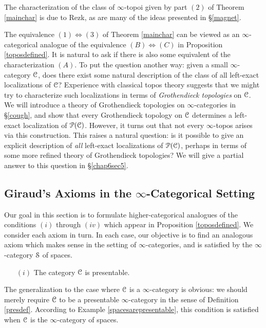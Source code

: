 \begin{remark}
The characterization of the class of $\infty$-topoi given by part $(2)$ of Theorem \ref{mainchar} is due to Rezk, as are many of the ideas presented in \S \ref{magnet}.
\end{remark}

The equivalence $(1) \Leftrightarrow (3)$ of Theorem \ref{mainchar} can be viewed as an $\infty$-categorical analogue of the equivalence $(B) \Leftrightarrow (C)$ in Proposition \ref{toposdefined}. 
It is natural to ask if there is also some equivalent of the characterization $(A)$. To put the question another way: given a small $\infty$-category $\operatorname{\mathcal{C}}$, does there exist some natural description of the class of all left-exact localizations of $\operatorname{\mathcal{C}}$? Experience with classical topos theory suggests that we might try to characterize such localizations in terms of {\em Grothendieck topologies} on $\operatorname{\mathcal{C}}$. We will introduce a theory of Grothendieck topologies on $\infty$-categories in \S \ref{cough}, and show that every Grothendieck topology on $\operatorname{\mathcal{C}}$ determines a left-exact localization of $\operatorname{\mathcal{P}}(\operatorname{\mathcal{C}})$. However, it turns out that not every $\infty$-topos arises via this construction. This raises a natural question: is it possible to give an explicit description of {\em all} left-exact localizations of $\operatorname{\mathcal{P}}(\operatorname{\mathcal{C}})$, perhaps in terms of some more refined theory of Grothendieck topologies? We will give a partial answer to this question in \S \ref{chap6sec5}.

\subsection{Giraud's Axioms in the $\infty$-Categorical Setting}\label{axgir}

Our goal in this section is to formulate higher-categorical analogues of the conditions $(i)$ through $(iv)$ which appear in Proposition \ref{toposdefined}. 
We consider each axiom in turn. In each case, our objective is to find an analogous axiom which makes sense in the setting of $\infty$-categories, and is satisfied by the $\infty$-category $\operatorname{\mathcal{S}}$
of spaces. 

\begin{itemize}
\item[$(i)$] The category $\operatorname{\mathcal{C}}$ is presentable.
\end{itemize}

The generalization to the case where $\operatorname{\mathcal{C}}$ is a $\infty$-category is obvious: we should merely require $\operatorname{\mathcal{C}}$ to be a presentable $\infty$-category in the sense of Definition \ref{presdef}.
According to Example \ref{spacesarepresentable}, this condition is satisfied when $\operatorname{\mathcal{C}}$ is the $\infty$-category of spaces.

